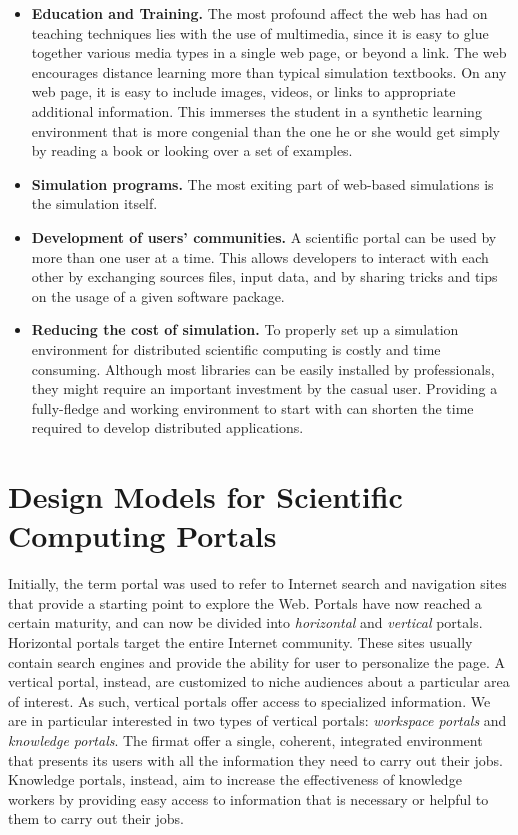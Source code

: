 \documentclass[11pt,relax]{SANDreport}
\begin{document}
\begin{itemize}
%
\item {\bf Education and Training.}
The most profound affect the web has had on teaching techniques lies with the
use of multimedia, since it is easy to glue together various media types in a
single web page, or beyond a link. The web encourages distance learning more
than typical simulation textbooks. On any web page, it is easy to include
images, videos, or links to appropriate additional information. This immerses
the student in a synthetic learning environment that is more congenial than
the one he or she would get simply by reading a book or looking over a set of
examples.
%
\item {\bf Simulation programs.} The most exiting part of web-based
simulations is the simulation itself.
%
\item {\bf Development of users' communities.} A scientific portal can be used
by more than one user at a time. This allows developers to interact with each
other by exchanging sources files, input data, and by sharing tricks and tips
on the usage of a given software package.
%
\item {\bf Reducing the cost of simulation.} To properly set up a simulation
environment for distributed scientific computing is costly and time consuming.
Although most libraries can be easily installed by professionals, they might
require an important investment by the casual user. Providing a fully-fledge
and working environment to start with can shorten the time required to develop
distributed applications.
\end{itemize}


\section{Design Models for Scientific Computing Portals}
\label{sec:design}

Initially, the term portal was used to refer to Internet search and navigation
sites that provide a starting point to explore the Web. Portals have now
reached a certain maturity, and can now be divided into {\sl horizontal} and
{\sl vertical} portals. Horizontal portals target the entire Internet
community. These sites usually contain search engines and provide the ability
for user to personalize the page. A vertical portal, instead, are customized
to niche audiences about a particular area of interest. As such, vertical
portals offer access to specialized information. We are in particular
interested in two types of vertical portals: {\sl workspace portals} and {\sl
knowledge portals}. The firmat offer a single, coherent, integrated
environment that presents its users with all the information they need to
carry out their jobs. Knowledge portals, instead, aim to increase the
effectiveness of knowledge workers by providing easy access to information
that is necessary or helpful to them to carry out their jobs. 
\end{document}
